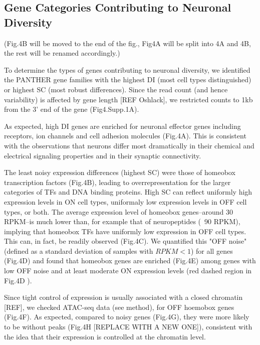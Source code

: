\subsection{Gene Categories Contributing to Neuronal Diversity}

(Fig.4B will be moved to the end of the fig., Fig4A will be split into 4A and 4B, the rest will be renamed accordingly.)

To determine the types of genes contributing to neuronal diversity, we identified the PANTHER gene families with the highest DI (most cell types distinguished) or highest SC (most robust differences). Since the read count (and hence variability) is affected by gene length [REF Oshlack], we restricted counts to 1kb from the 3' end of the gene (Fig4.Supp.1A). 

As expected, high DI genes are enriched for neuronal effector genes including receptors, ion channels and cell adhesion molecules (Fig.4A). This is consistent with the observations that neurons differ most dramatically in their chemical and electrical signaling properties and in their synaptic connectivity.

The least noisy expression differences (highest SC) were those of homeobox transcription factors (Fig.4B), leading to overrepresentation for the larger categories of TFs and DNA binding proteins. High SC can reflect uniformly high expression levels in ON cell types, uniformaly low expression levels in OFF cell types, or both. The average expression level of homeobox genes--around 30 RPKM--is much lower than, for example that of  neuropeptides (~90 RPKM), implying that homeobox TFs have uniformly low expression in OFF cell types. This can, in fact, be readily observed (Fig.4C). We quantified this "OFF noise" (defined as a standard deviation of samples with $RPKM<1$) for all genes (Fig.4D) and found that homeobox genes are enriched (Fig.4E) among genes with low OFF noise and at least moderate ON expression levels (red dashed region in Fig.4D ).

Since tight control of expression is usually associated with a closed chromatin [REF], we checked ATAC-seq data (see method), for OFF hoemobox genes (Fig.4F). As expected, compared to noisy genes (Fig.4G), they were more likely to be without peaks (Fig.4H [REPLACE WITH A NEW ONE]), consistent with the idea that their expression is controlled at the chromatin level.

